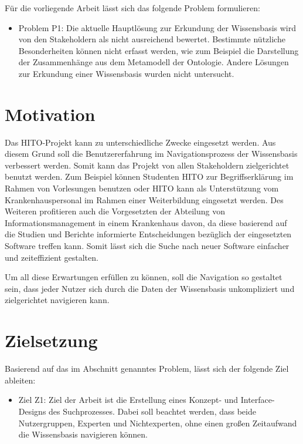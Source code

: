 Für die vorliegende Arbeit lässt sich das folgende Problem formulieren:

\begin{itemize}
\item Problem P1: Die aktuelle Hauptlösung zur Erkundung der Wissensbasis wird von den Stakeholdern als nicht ausreichend bewertet.
Bestimmte nützliche Besonderheiten können nicht erfasst werden, wie zum Beispiel die Darstellung der Zusammenhänge aus dem Metamodell der Ontologie. 
Andere Lösungen zur Erkundung einer Wissensbasis wurden nicht untersucht.
\end{itemize}

\section{Motivation}\label{sec:motivation}

Das HITO-Projekt kann zu unterschiedliche Zwecke eingesetzt werden. Aus diesem Grund soll die Benutzererfahrung im Navigationsprozess der Wissensbasis verbessert werden. Somit kann das Projekt von allen Stakeholdern zielgerichtet benutzt werden. Zum Beispiel können Studenten HITO zur Begriffserklärung im Rahmen von Vorlesungen benutzen oder HITO kann als Unterstützung vom Krankenhauspersonal im Rahmen einer Weiterbildung eingesetzt werden. Des Weiteren profitieren auch die Vorgesetzten der Abteilung von Informationsmanagement in einem Krankenhaus davon, da diese basierend auf die Studien und Berichte informierte Entscheidungen bezüglich der eingesetzten Software treffen kann. Somit lässt sich die Suche nach neuer Software einfacher und zeiteffizient gestalten.

Um all diese Erwartungen erfüllen zu können, soll die Navigation so gestaltet sein, dass jeder Nutzer sich durch die Daten der Wissensbasis unkompliziert und zielgerichtet navigieren kann.

\section{Zielsetzung}\label{sec:zielsetzung}

Basierend auf das im Abschnitt  genanntes Problem, lässt sich der folgende Ziel ableiten:

\begin{itemize}
\item Ziel Z1: Ziel der Arbeit ist die Erstellung eines Konzept- und Interface-Designs des Suchprozesses. 
Dabei soll beachtet werden, dass beide Nutzergruppen, Experten und Nichtexperten, ohne einen großen Zeitaufwand die Wissensbasis navigieren können.
\end{itemize}

